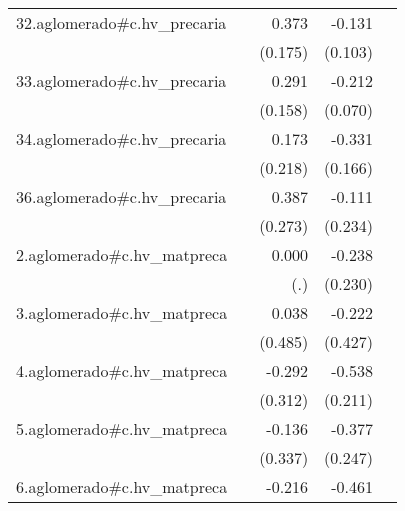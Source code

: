 {\begin{longtable}{l*{4}{D{.}{.}{-1}}}
\addlinespace
32.aglomerado#c.hv\_precaria&                     &       0.373\sym{*}  &      -0.131         &                     \\
            &                     &     (0.175)         &     (0.103)         &                     \\
\addlinespace
33.aglomerado#c.hv\_precaria&                     &       0.291         &      -0.212\sym{**} &                     \\
            &                     &     (0.158)         &     (0.070)         &                     \\
\addlinespace
34.aglomerado#c.hv\_precaria&                     &       0.173         &      -0.331\sym{*}  &                     \\
            &                     &     (0.218)         &     (0.166)         &                     \\
\addlinespace
36.aglomerado#c.hv\_precaria&                     &       0.387         &      -0.111         &                     \\
            &                     &     (0.273)         &     (0.234)         &                     \\
\addlinespace
2.aglomerado#c.hv\_matpreca&                     &       0.000         &      -0.238         &                     \\
            &                     &         (.)         &     (0.230)         &                     \\
\addlinespace
3.aglomerado#c.hv\_matpreca&                     &       0.038         &      -0.222         &                     \\
            &                     &     (0.485)         &     (0.427)         &                     \\
\addlinespace
4.aglomerado#c.hv\_matpreca&                     &      -0.292         &      -0.538\sym{*}  &                     \\
            &                     &     (0.312)         &     (0.211)         &                     \\
\addlinespace
5.aglomerado#c.hv\_matpreca&                     &      -0.136         &      -0.377         &                     \\
            &                     &     (0.337)         &     (0.247)         &                     \\
\addlinespace
6.aglomerado#c.hv\_matpreca&                     &      -0.216         &      -0.461\sym{**} &                     \\

\end{longtable}}
